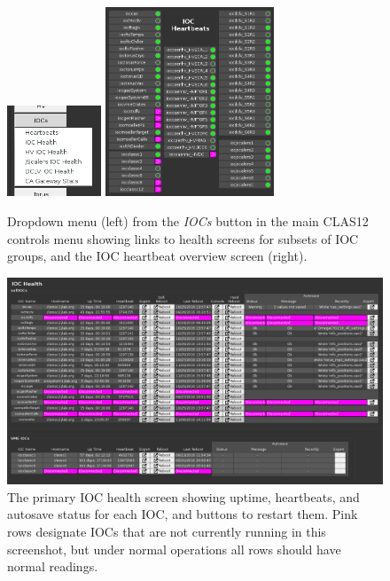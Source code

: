 \documentclass[amsmath,amssymb,notitlepage,11pt]{revtex4}
\begin{document}
\begin{figure}[htbp]\centering
  \includegraphics[width=0.25\textwidth]{pics/iocmenu}
  \includegraphics[width=0.45\textwidth]{pics/iocbeats}
  \caption{Dropdown menu (left) from the {\em IOCs} button in the main CLAS12 controls menu showing links to health screens for subsets of IOC groups, and the IOC heartbeat overview screen (right).\label{fig:iocmenu}}
\end{figure}

\begin{figure}[htbp]\centering
  \includegraphics[width=\textwidth]{pics/iochealth}
  \caption{The primary IOC health screen showing uptime, heartbeats, and autosave status for each IOC, and buttons to restart them.  Pink rows designate IOCs that are not currently running in this screenshot, but under normal operations all rows should have normal readings.  \label{fig:iochealth}}
\end{figure}
\end{document}
